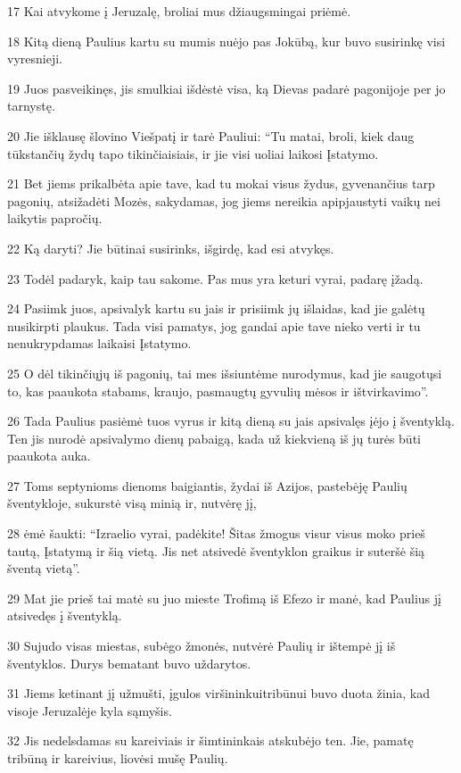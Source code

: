 \par 17 Kai atvykome į Jeruzalę, broliai mus džiaugsmingai priėmė. 
\par 18 Kitą dieną Paulius kartu su mumis nuėjo pas Jokūbą, kur buvo susirinkę visi vyresnieji. 
\par 19 Juos pasveikinęs, jis smulkiai išdėstė visa, ką Dievas padarė pagonijoje per jo tarnystę. 
\par 20 Jie išklausę šlovino Viešpatį ir tarė Pauliui: “Tu matai, broli, kiek daug tūkstančių žydų tapo tikinčiaisiais, ir jie visi uoliai laikosi Įstatymo. 
\par 21 Bet jiems prikalbėta apie tave, kad tu mokai visus žydus, gyvenančius tarp pagonių, atsižadėti Mozės, sakydamas, jog jiems nereikia apipjaustyti vaikų nei laikytis papročių. 
\par 22 Ką daryti? Jie būtinai susirinks, išgirdę, kad esi atvykęs. 
\par 23 Todėl padaryk, kaip tau sakome. Pas mus yra keturi vyrai, padarę įžadą. 
\par 24 Pasiimk juos, apsivalyk kartu su jais ir prisiimk jų išlaidas, kad jie galėtų nusikirpti plaukus. Tada visi pamatys, jog gandai apie tave nieko verti ir tu nenukrypdamas laikaisi Įstatymo. 
\par 25 O dėl tikinčiųjų iš pagonių, tai mes išsiuntėme nurodymus, kad jie saugotųsi to, kas paaukota stabams, kraujo, pasmaugtų gyvulių mėsos ir ištvirkavimo”. 
\par 26 Tada Paulius pasiėmė tuos vyrus ir kitą dieną su jais apsivalęs įėjo į šventyklą. Ten jis nurodė apsivalymo dienų pabaigą, kada už kiekvieną iš jų turės būti paaukota auka. 
\par 27 Toms septynioms dienoms baigiantis, žydai iš Azijos, pastebėję Paulių šventykloje, sukurstė visą minią ir, nutvėrę jį, 
\par 28 ėmė šaukti: “Izraelio vyrai, padėkite! Šitas žmogus visur visus moko prieš tautą, Įstatymą ir šią vietą. Jis net atsivedė šventyklon graikus ir suteršė šią šventą vietą”. 
\par 29 Mat jie prieš tai matė su juo mieste Trofimą iš Efezo ir manė, kad Paulius jį atsivedęs į šventyklą. 
\par 30 Sujudo visas miestas, subėgo žmonės, nutvėrė Paulių ir ištempė jį iš šventyklos. Durys bematant buvo uždarytos. 
\par 31 Jiems ketinant jį užmušti, įgulos viršininkui­tribūnui buvo duota žinia, kad visoje Jeruzalėje kyla sąmyšis. 
\par 32 Jis nedelsdamas su kareiviais ir šimtininkais atskubėjo ten. Jie, pamatę tribūną ir kareivius, liovėsi mušę Paulių. 
